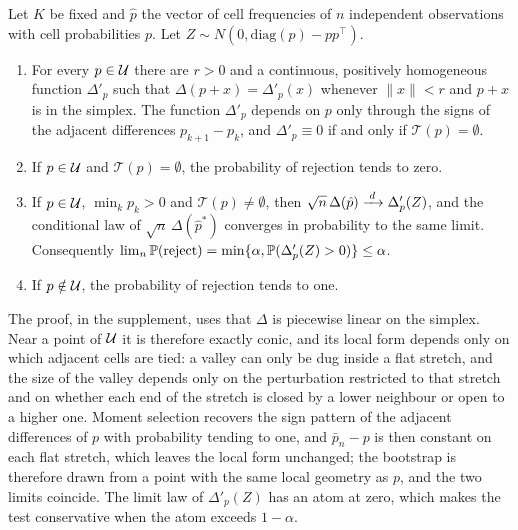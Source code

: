\begin{theorem}\label{thm:boot}
Let $K$ be fixed and $\hat p$ the vector of cell frequencies of $n$ independent observations with cell probabilities $p$. Let $Z\sim N(0,\mathrm{diag}(p)-pp^\top)$.
\begin{enumerate}
\item[(a)] For every $p\in\mathcal{U}$ there are $r>0$ and a continuous, positively homogeneous function $\Delta'_p$ such that $\Delta(p+x)=\Delta'_p(x)$ whenever $\|x\|<r$ and $p+x$ is in the simplex. The function $\Delta'_p$ depends on $p$ only through the signs of the adjacent differences $p_{k+1}-p_k$, and $\Delta'_p\equiv0$ if and only if $\mathcal T(p)=\emptyset$.
\item[(b)] If $p\in\mathcal{U}$ and $\mathcal T(p)=\emptyset$, the probability of rejection tends to zero.
\item[(c)] If $p\in\mathcal{U}$, $\min_kp_k>0$ and $\mathcal T(p)\ne\emptyset$, then $\sqrt n\,\Delta(\hat p)\xrightarrow{\;d\;}\Delta'_p(Z)$, and the conditional law of $\sqrt n\,\Delta(\hat p^\ast)$ converges in probability to the same limit. Consequently $\lim_n\mathbb{P}(\text{reject})=\min\{\alpha,\mathbb{P}(\Delta'_p(Z)>0)\}\le\alpha$.
\item[(d)] If $p\notin\mathcal{U}$, the probability of rejection tends to one.
\end{enumerate}
\end{theorem}

The proof, in the supplement, uses that $\Delta$ is piecewise linear on the simplex. Near a point of $\mathcal{U}$ it is therefore exactly conic, and its local form depends only on which adjacent cells are tied: a valley can only be dug inside a flat stretch, and the size of the valley depends only on the perturbation restricted to that stretch and on whether each end of the stretch is closed by a lower neighbour or open to a higher one. Moment selection recovers the sign pattern of the adjacent differences of $p$ with probability tending to one, and $\bar p_n-p$ is then constant on each flat stretch, which leaves the local form unchanged; the bootstrap is therefore drawn from a point with the same local geometry as $p$, and the two limits coincide. The limit law of $\Delta'_p(Z)$ has an atom at zero, which makes the test conservative when the atom exceeds $1-\alpha$.

